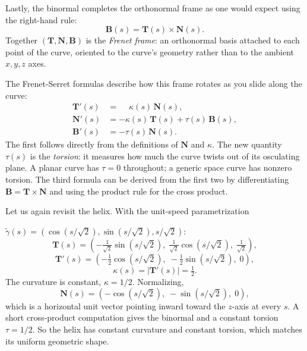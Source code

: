 \documentclass{article}
\begin{document}
Lastly, the binormal completes the orthonormal frame as one would expect using the right-hand rule:
$$\mathbf{B}(s) = \mathbf{T}(s) \times \mathbf{N}(s).$$
Together $(\mathbf{T}, \mathbf{N}, \mathbf{B})$ is the \textit{Frenet frame}: an orthonormal basis attached to each point of the curve, oriented to the curve's geometry rather than to the ambient $x, y, z$ axes.

The Frenet-Serret formulas describe how this frame rotates as you slide along the curve:
\begin{align*}
\mathbf{T}'(s) &= \phantom{-}\kappa(s)\, \mathbf{N}(s), \\
\mathbf{N}'(s) &= -\kappa(s)\, \mathbf{T}(s) + \tau(s)\, \mathbf{B}(s), \\
\mathbf{B}'(s) &= -\tau(s)\, \mathbf{N}(s).
\end{align*}
The first follows directly from the definitions of $\mathbf{N}$ and $\kappa$. The new quantity $\tau(s)$ is the \textit{torsion}: it measures how much the curve twists out of its osculating plane. A planar curve has $\tau = 0$ throughout; a generic space curve has nonzero torsion. The third formula can be derived from the first two by differentiating $\mathbf{B} = \mathbf{T} \times \mathbf{N}$ and using the product rule for the cross product.

Let us again revisit the helix. With the unit-speed parametrization 

$\tilde{\gamma}(s) = (\cos(s/\sqrt{2}), \sin(s/\sqrt{2}), s/\sqrt{2})$:
$$\mathbf{T}(s) = \left(-\tfrac{1}{\sqrt{2}}\sin(s/\sqrt{2}),\; \tfrac{1}{\sqrt{2}}\cos(s/\sqrt{2}),\; \tfrac{1}{\sqrt{2}}\right),$$
$$\mathbf{T}'(s) = \left(-\tfrac{1}{2}\cos(s/\sqrt{2}),\; -\tfrac{1}{2}\sin(s/\sqrt{2}),\; 0\right),$$
$$\kappa(s) = |\mathbf{T}'(s)| = \tfrac{1}{2}.$$
The curvature is constant, $\kappa = 1/2$. Normalizing,
$$\mathbf{N}(s) = \left(-\cos(s/\sqrt{2}),\; -\sin(s/\sqrt{2}),\; 0\right),$$
which is a horizontal unit vector pointing inward toward the $z$-axis at every $s$. A short cross-product computation gives the binormal and a constant torsion $\tau = 1/2$. So the helix has constant curvature and constant torsion, which matches its uniform geometric shape.
\end{document}
